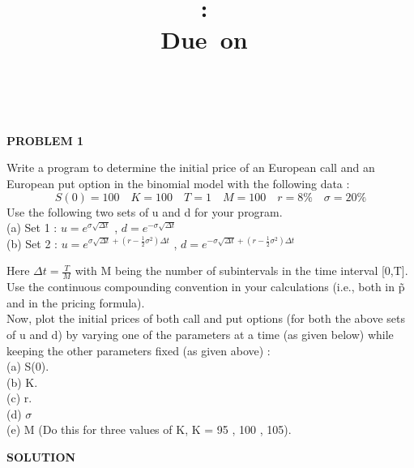 \documentclass{article}
\title{
\vspace{2in}
\textmd{\textbf{\hmwkClass:\ \hmwkTitle}}\\
\normalsize\vspace{0.1in}\small{Due\ on\ \hmwkDueDate}\\
\vspace{0.1in}\large{\textit{\hmwkClassInstructor\ \hmwkClassTime}}
\vspace{3in}
}
\author{\textbf{\hmwkAuthorName}}
\date{} %
\begin{document}
\maketitle



\newpage


\begin{center}
\textbf{PROBLEM 1}
\end{center}

Write a program to determine the initial price of an European call and an European put option in the binomial
model with the following data :
$$S(0) = 100 \quad K = 100 \quad T = 1 \quad M = 100 \quad r = 8\% \quad \sigma = 20\%$$
Use the following two sets of u and d for your program.\\
(a) Set 1 : $u = e^{\sigma \sqrt{\Delta t}}$ , $d = e^{-\sigma \sqrt{\Delta t}}$\\
(b) Set 2 : $u = e^{\sigma \sqrt{\Delta t} + (r-\frac{1}{2}\sigma ^{2})\Delta t}$ , $d = e^{-\sigma \sqrt{\Delta t} + (r-\frac{1}{2}\sigma ^{2})\Delta t}$

Here $\Delta t = \frac{T}{M}$ with M being the number of subintervals in the time interval [0,T]. Use the continuous
compounding convention in your calculations (i.e., both in \~p and in the pricing formula).\\
Now, plot the initial prices of both call and put options (for both the above sets of u and d) by varying one of the
parameters at a time (as given below) while keeping the other parameters fixed (as given above) :\\
(a) S(0).\\
(b) K.\\
(c) r.\\
(d) $\sigma$\\
(e) M (Do this for three values of K, K = 95 , 100 , 105).

\begin{center}
\textbf{SOLUTION}
\end{center}
\end{document}

